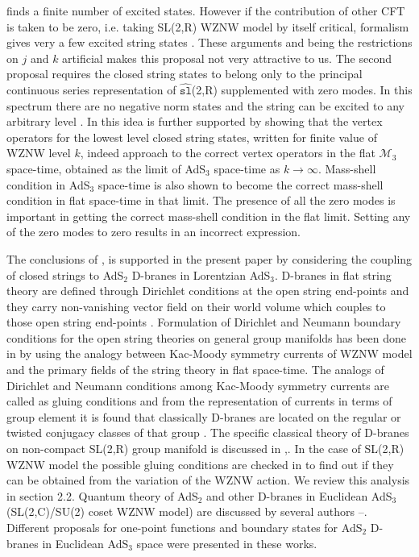 \documentclass[a4paper,12pt]{article}
\begin{document}
finds a finite number of excited states. However if the contribution of
other CFT is taken to be zero, i.e. taking SL(2,R) WZNW model by itself
critical, formalism gives very a few excited string states \cite{larsen}.
These arguments and being the restrictions on $j$ and $k$ artificial makes
this proposal not very attractive to us. The second proposal requires the
closed string states to belong only to the principal continuous series
representation of $\widehat{\mathtt{sl}}$(2,R) supplemented with zero modes.
In this spectrum there are no negative norm states and the string can be
excited to any arbitrary level \cite{bars1}. In \cite{BDM} this idea is
further supported by showing that the vertex operators for the lowest level
closed string states, written for finite value of WZNW level $k$, indeed
approach to the correct vertex operators in the flat $\mathcal{M}_{3}$
space-time, obtained as the limit of AdS$_{3}$ space-time as $k\rightarrow
\infty $. Mass-shell condition in AdS$_{3}$ space-time is also shown to
become the correct mass-shell condition in flat space-time in that limit.
The presence of all the zero modes is important in getting the correct
mass-shell condition in the flat limit. Setting any of the zero modes to
zero results in an incorrect expression.

The conclusions of \cite{bars1},\cite{BDM} is supported in the present paper
by considering the coupling of closed strings to AdS$_{2}$ D-branes in
Lorentzian AdS$_{3}$. D-branes in flat string theory are defined through
Dirichlet conditions at the open string end-points and they carry
non-vanishing vector field on their world volume which couples to those open
string end-points \cite{TASI}. Formulation of Dirichlet and Neumann boundary
conditions for the open string theories on general group manifolds has been
done in \cite{stanciu-0} by using the analogy between Kac-Moody symmetry
currents of WZNW model and the primary fields of the string theory in flat
space-time. The analogs of Dirichlet and Neumann conditions among Kac-Moody
symmetry currents are called as gluing conditions and from the
representation of currents in terms of group element it is found that
classically D-branes are located on the regular or twisted conjugacy classes
of that group \cite{stanciu-0}. The specific classical theory of D-branes on
non-compact SL(2,R) group manifold is discussed in \cite{stanciu},\cite
{bachas}. In the case of SL(2,R) WZNW model the possible gluing conditions
are checked in \cite{lomholt} to find out if they can be obtained from the
variation of the WZNW action. We review this analysis in section 2.2.
Quantum theory of AdS$_{2}$ and other D-branes in Euclidean AdS$_{3}$
(SL(2,C)/SU(2) coset WZNW model) are discussed by several authors \cite
{ads2d}--\cite{ponsot}. Different proposals for one-point functions and
boundary states for AdS$_{2}$ D-branes in Euclidean AdS$_{3}$ space were
presented in these works.
\end{document}
